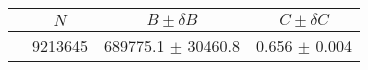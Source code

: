 \begin{tabular}{lccc}
\hline
    &   $N$   & $B \pm \delta B$  &  $C \pm \delta C$ \\
\hline
                               & 9213645    & 689775.1   $\pm$ 30460.8 & 0.656      $\pm$ 0.004 \\
\hline
\end{tabular}
